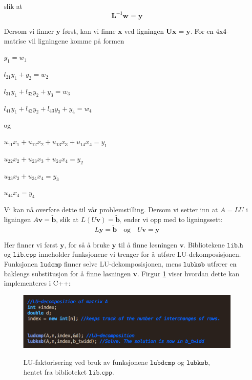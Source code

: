 \documentclass{article}
\begin{document}
slik at 
\[\textbf{L}^{-1} \textbf{w = y} \]

Dersom vi finner $\textbf{y}$ først, kan vi finne $\textbf{x}$ ved ligningen $\textbf{Ux = y}$. For en 4x4-matrise vil ligningene komme på formen

 \hfill $y_1 = w_1$
 
 \hfill $l_{21}y_1+ y_2 = w_2$
 
 \hfill $l_{31}y_1 + l_{32}y_2 + y_3 = w_3$
 
 \hfill $l_{41}y_1 + l_{42}y_2 + l_{43}y_3 + y_4 = w_4$
 
 og
 
\hfill $u_{11}x_1 + u_{12}x_2 + u_{13}x_3 + u_{14}x_4 = y_1$
 
\hfill $u_{22}x_2 + u_{23}x_3 + u_{24}x_4 = y_2$

\hfill $u_{33}x_3 + u_{34}x_4 = y_3$

\hfill $u_{44}x_4 = y_4$

\hfill \break

Vi kan nå overføre dette til vår problemstilling. Dersom vi setter inn at $A=LU$ i ligningen $A\textbf{v}=\tilde{\textbf{b}}$, slik at $L(U\textbf{v}) = \tilde{\textbf{b}}$, ender vi opp med to ligningssett:
\begin{equation}
L\textbf{y} = \tilde{\textbf{b}} \quad \textrm{og} \quad U\textbf{v} = \textbf{y}
\end{equation}

Her finner vi først $\textbf{y}$, for så å bruke $\textbf{y}$ til å finne løsningen $\textbf{v}$. Bibliotekene $\texttt{lib.h}$ og $\texttt{lib.cpp}$ inneholder funksjonene vi trenger for å utføre LU-dekomposisjonen. Funksjonen $\texttt{ludcmp}$ finner selve LU-dekomposisjonen, mens $\texttt{lubksb}$ utfører en baklengs substitusjon for å finne løsningen $\textbf{v}$. Firgur \ref{fig:LU} viser hvordan dette kan implementeres i C++:

\FloatBarrier
\begin{figure}[!ht]
  \begin{center}
  \includegraphics[width = 130mm]{LU.png}\\
  \caption{LU-faktorisering ved bruk av funksjonene $\texttt{lubdcmp}$ og $\texttt{lubksb}$, hentet fra biblioteket $\texttt{lib.cpp}$.}\label{fig:LU}
  \end{center}
\end{figure}
\FloatBarrier
\end{document}
